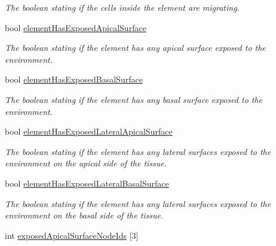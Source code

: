 \begin{DoxyCompactItemize}
\begin{DoxyCompactList}\small\item\em The boolean stating if the cells inside the element are migrating. \end{DoxyCompactList}\item 
\hypertarget{classShapeBase_ab5dfa04e7a8c7f2c33bea431ca441674}{}bool \hyperlink{classShapeBase_ab5dfa04e7a8c7f2c33bea431ca441674}{element\+Has\+Exposed\+Apical\+Surface}\label{classShapeBase_ab5dfa04e7a8c7f2c33bea431ca441674}

\begin{DoxyCompactList}\small\item\em The boolean stating if the element has any apical surface exposed to the environment. \end{DoxyCompactList}\item 
\hypertarget{classShapeBase_a194437fa296d9e12e58cc14fa8d66931}{}bool \hyperlink{classShapeBase_a194437fa296d9e12e58cc14fa8d66931}{element\+Has\+Exposed\+Basal\+Surface}\label{classShapeBase_a194437fa296d9e12e58cc14fa8d66931}

\begin{DoxyCompactList}\small\item\em The boolean stating if the element has any basal surface exposed to the environment. \end{DoxyCompactList}\item 
\hypertarget{classShapeBase_a61b69e26e541b7965551c745bdae675e}{}bool \hyperlink{classShapeBase_a61b69e26e541b7965551c745bdae675e}{element\+Has\+Exposed\+Lateral\+Apical\+Surface}\label{classShapeBase_a61b69e26e541b7965551c745bdae675e}

\begin{DoxyCompactList}\small\item\em The boolean stating if the element has any lateral surfaces exposed to the environment on the apical side of the tissue. \end{DoxyCompactList}\item 
\hypertarget{classShapeBase_aefe2d3d8595226d22ee0b75a92f939b5}{}bool \hyperlink{classShapeBase_aefe2d3d8595226d22ee0b75a92f939b5}{element\+Has\+Exposed\+Lateral\+Basal\+Surface}\label{classShapeBase_aefe2d3d8595226d22ee0b75a92f939b5}

\begin{DoxyCompactList}\small\item\em The boolean stating if the element has any lateral surfaces exposed to the environment on the basal side of the tissue. \end{DoxyCompactList}\item 
\hypertarget{classShapeBase_a7987e6fc21a5035fc04558f1b366406a}{}int \hyperlink{classShapeBase_a7987e6fc21a5035fc04558f1b366406a}{exposed\+Apical\+Surface\+Node\+Ids} \mbox{[}3\mbox{]}\label{classShapeBase_a7987e6fc21a5035fc04558f1b366406a}


\end{DoxyCompactItemize}
